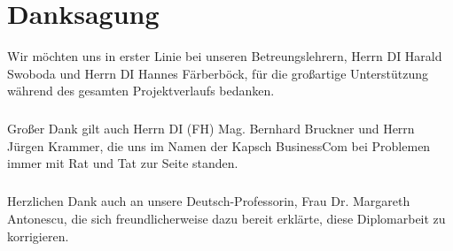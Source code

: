 \chapter{Danksagung}
Wir möchten uns in erster Linie bei unseren Betreungslehrern, Herrn DI Harald Swoboda und Herrn DI Hannes Färberböck, für die großartige Unterstützung während des gesamten Projektverlaufs bedanken.
\paragraph*{}
Großer Dank gilt auch Herrn DI (FH) Mag. Bernhard Bruckner und \newline Herrn Jürgen Krammer, die uns im Namen der Kapsch BusinessCom bei Problemen immer mit Rat und Tat zur Seite standen.
\paragraph*{}
Herzlichen Dank auch an unsere Deutsch-Professorin, Frau Dr. Margareth Antonescu, die sich freundlicherweise dazu bereit erklärte, diese Diplomarbeit zu korrigieren.

